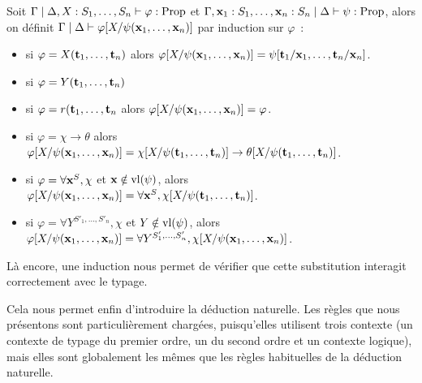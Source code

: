 \documentclass{article}
\begin{document}
\begin{defi}
    Soit $\Gamma\mid \Delta, X : S_1,\ldots,S_n\vdash \varphi : \mathrm{Prop}$ et $\Gamma, \mathbf{x}_1 : S_1,\ldots, \mathbf{x}_n : S_n\mid\Delta\vdash \psi : \mathrm{Prop}$, alors on définit $\Gamma\mid\Delta\vdash\varphi[X/\psi(\mathbf{x}_1,\ldots,\mathbf{x}_n)]$ par induction sur $\varphi$~:
    \begin{itemize}
        \item si $\varphi = X(\mathbf{t}_1,\ldots,\mathbf{t}_n)$ alors $\varphi[X/\psi(\mathbf{x}_1,\ldots,\mathbf{x}_n)] = \psi[\mathbf{t}_1/\mathbf{x}_1,\ldots,\mathbf{t}_n/\mathbf{x}_n]$.
        \item si $\varphi = Y(\mathbf{t}_1,\ldots,\mathbf{t}_n)$
        \item si $\varphi = r(\mathbf{t}_1,\ldots,\mathbf{t}_n$ alors $\varphi[X/\psi(\mathbf{x}_1,\ldots,\mathbf{x}_n)] = \varphi$.
        \item si $\varphi = \chi \to \theta$ alors $\varphi[X/\psi(\mathbf{x}_1,\ldots,\mathbf{x}_n)] = \chi[X/\psi(\mathbf{t}_1,\ldots,\mathbf{t}_n)] \to \theta[X/\psi(\mathbf{t}_1,\ldots,\mathbf{t}_n)]$.
        \item si $\varphi = \forall \mathbf{x}^S, \chi$ et $\mathbf{x} \notin \mathrm{vl}(\psi)$, alors $\varphi[X/\psi(\mathbf{x}_1,\ldots,\mathbf{x}_n)] = \forall \mathbf{x}^S, \chi[X/\psi(\mathbf{t}_1,\ldots,\mathbf{t}_n)]$.
        \item si $\varphi = \forall Y^{S'_1,\ldots,S'_n}, \chi$ et $Y\notin\mathrm{vl}(\psi)$, alors $\varphi[X/\psi(\mathbf{x}_1,\ldots,\mathbf{x}_n)] = \forall Y^{S'_1,\ldots,S'_n}, \chi[X/\psi(\mathbf{x}_1,\ldots,\mathbf{x}_n)]$.
    \end{itemize}
\end{defi}

Là encore, une induction nous permet de vérifier que cette substitution interagit correctement avec le typage.

Cela nous permet enfin d'introduire la déduction naturelle. Les règles que nous présentons sont particulièrement chargées, puisqu'elles utilisent trois contexte (un contexte de typage du premier ordre, un du second ordre et un contexte logique), mais elles sont globalement les mêmes que les règles habituelles de la déduction naturelle.
\end{document}

